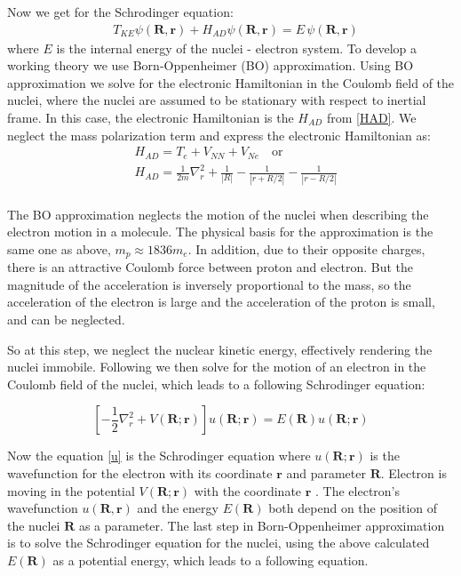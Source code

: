Now we get for the Schrodinger equation:
\begin{equation}
\begin{split}
& T_{KE}\psi(\mathbf{R},\mathbf{r}) + H_{AD}\psi(\mathbf{R},\mathbf{r}) = E \, \psi(\mathbf{R},\mathbf{r})
\end{split}
\end{equation}
where $ E $ is the internal energy of the nuclei - electron system. To develop a working theory we use Born-Oppenheimer (BO) approximation. Using BO approximation we solve for the electronic Hamiltonian in the Coulomb field of the nuclei, where the nuclei are assumed to be stationary with respect to inertial frame. In this case, the electronic Hamiltonian is the $ H_{AD} $ from \eqref{HAD}. We neglect the mass polarization term and express the electronic Hamiltonian as:
\begin{equation}\label{HAD2}
\begin{split}
& H_{AD} = T_e + V_{NN} + V_{Ne}\,\,\,\,\text{ or }\\[.8em]
& H_{AD} = \frac{1}{2m}\nabla_r^2 + \frac{1}{\left|R\right|} - \frac{1}{\left|r + R/2\right|} - \frac{1}{\left|r - R/2\right|} \\[.8em]
\end{split}
\end{equation}

The BO approximation neglects the motion of the nuclei when describing the electron motion in a molecule. The physical basis for the approximation is the same one as above, $ m_p \approx 1836 m_e $. In addition, due to their opposite charges, there is an attractive Coulomb force between proton and electron. But the magnitude of the acceleration is inversely proportional to the mass, so the acceleration of the electron is large and the acceleration of the  proton is small, and can be neglected.

So at this step, we neglect the nuclear kinetic energy, effectively rendering the nuclei immobile. Following \cite{Slater} we then solve for the motion of an electron in the Coulomb field of the nuclei, which leads to a following Schrodinger equation:

\begin{equation}\label{u}
\left[ -\frac{1}{2}\nabla_r^2 + V(\mathbf{R};\mathbf{r}) \right] u( \mathbf{R}; \mathbf{r} ) = E( \mathbf{R} ) u( \mathbf{R}; \mathbf{r} ) 
\end{equation}

Now the equation \eqref{u} is the Schrodinger equation where $ u( \mathbf{R}; \mathbf{r} ) $ is the wavefunction for the electron with its coordinate $ \textbf{r} $ and parameter $ \textbf{R} $. Electron is moving in the potential $ V(\mathbf{R};\mathbf{r})$ with the coordinate $ \mathbf{r} $ .  The electron's wavefunction $ u( \mathbf{R},\mathbf{r} ) $ and the energy $ E(\mathbf{R}) $ both depend on the position of the nuclei $ \mathbf{R} $ as a parameter. The last step in Born-Oppenheimer approximation is to solve the Schrodinger equation for the nuclei, using the above calculated $ E(\mathbf{R}) $ as a potential energy, which leads to a following equation.

